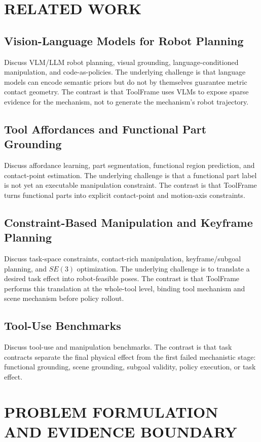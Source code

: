 \documentclass[letterpaper, 10 pt, conference]{ieeeconf}
\newcommand{\method}{ToolFrame}
\begin{document}
\section{RELATED WORK}

\subsection{Vision-Language Models for Robot Planning}
Discuss VLM/LLM robot planning, visual grounding, language-conditioned
manipulation, and code-as-policies. The underlying challenge is that language
models can encode semantic priors but do not by themselves guarantee metric
contact geometry. The contrast is that \method{} uses VLMs to expose sparse
evidence for the mechanism, not to generate the mechanism's robot trajectory.

\subsection{Tool Affordances and Functional Part Grounding}
Discuss affordance learning, part segmentation, functional region prediction,
and contact-point estimation. The underlying challenge is that a functional
part label is not yet an executable manipulation constraint. The contrast is
that \method{} turns functional parts into explicit contact-point and
motion-axis constraints.

\subsection{Constraint-Based Manipulation and Keyframe Planning}
Discuss task-space constraints, contact-rich manipulation, keyframe/subgoal
planning, and $SE(3)$ optimization. The underlying challenge is to translate a
desired task effect into robot-feasible poses. The contrast is that \method{}
performs this translation at the whole-tool level, binding tool mechanism and
scene mechanism before policy rollout.

\subsection{Tool-Use Benchmarks}
Discuss tool-use and manipulation benchmarks. The contrast is that task
contracts separate the final physical effect from the first failed mechanistic
stage: functional grounding, scene grounding, subgoal validity, policy
execution, or task effect.

\section{PROBLEM FORMULATION AND EVIDENCE BOUNDARY}
\end{document}
